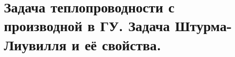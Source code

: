 \section{Задача теплопроводности с производной в ГУ. Задача Штурма-Лиувилля и её
свойства.}

\newpage

